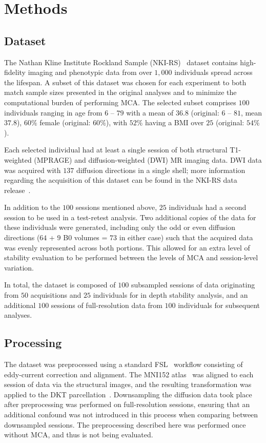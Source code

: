 \documentclass[fleqn,10pt]{SelfArx} %
\newcommand{\new}[1]{{\color{blue} #1}}
\begin{document}
\newpage
\section*{Methods}

\subsection*{Dataset}
The Nathan Kline Institute Rockland Sample (NKI-RS)~\cite{Nooner2012-eg} dataset contains high-fidelity imaging and
phenotypic data from over $1,000$ individuals spread across the lifespan. A subset of this dataset was chosen for each
experiment to both match sample sizes presented in the original analyses and to minimize the computational burden of
performing MCA. The selected subset comprises $100$ individuals ranging in age from $6$ – $79$ with a mean of $36.8$
(original: $6$ – $81$, mean $37.8$), $60\%$ female (original: $60\%$), with $52\%$ having a BMI over $25$ (original:
$54\%$).

Each selected individual had at least a single session of both structural T1-weighted (MPRAGE) and diffusion-weighted
(DWI) MR imaging data. DWI data was acquired with $137$ diffusion directions \new{in a single shell}; more information regarding the
acquisition of this dataset can be found in the NKI-RS data release~\cite{Nooner2012-eg}.

In addition to the $100$ sessions mentioned above, $25$ individuals had a second session to be used in a test-retest
analysis. Two additional copies of the data for these individuals were generated, including only the odd or even
diffusion directions ($64$ + $9$ B0 volumes = $73$ in either case) \new{such that the acquired data was evenly
represented across both portions}. This allowed for an extra level of stability evaluation to be performed between the
levels of MCA and session-level variation.

In total, the dataset is composed of $100$ \new{sub}sampled sessions of data originating from $50$ acquisitions
and $25$ individuals for in depth stability analysis, and an additional $100$ sessions of full-resolution data from
$100$ individuals for subsequent analyses.


\subsection*{Processing}
The dataset was preprocessed using a standard FSL~\cite{Jenkinson2012-ly} workflow consisting of eddy-current
correction and alignment. The MNI152 atlas~\cite{lancaster2007bias} was aligned to each session of data \new{via the
structural images}, and the
resulting transformation was applied to the DKT parcellation~\cite{Klein2012-vi}. Downsampling the diffusion data took
place after preprocessing was performed on full-resolution sessions, ensuring that an additional confound was not
introduced in this process when comparing between downsampled sessions. The preprocessing described here was performed
once without MCA, and thus is not being evaluated.
\end{document}
